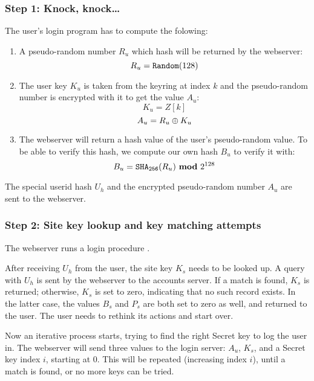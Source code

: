 \subsubsection{Step 1: Knock, knock\ldots}
\label{sec:login_step1}
The user's login program has to compute the folowing:
\begin{enumerate}
\item A pseudo-random number $R_u$ which hash will be returned by the webserver:
\[R_u=\texttt{Random}(128)\]
\item The user key $K_u$ is taken from the keyring at index $k$ and the pseudo-random number is encrypted with it to get the value $A_u$:
\[K_u=Z[k]\]
\[A_u=R_u\oplus K_u\]
\item The webserver will return a hash value of the user's pseudo-random value.
To be able to verify this hash,
we compute our own hash $B_u$ to verify it with:
\[B_u=\texttt{\ensuremath{\mathtt{SHA_{256}}}}(R_u)\ \textbf{mod}\ 2^{128}\]
\end{enumerate}
The special userid hash $U_h$ and the encrypted pseudo-random number $A_u$ are sent to the webserver.

\subsubsection{Step 2: Site key lookup and key matching attempts}
\label{sec:login_step2}
The webserver runs a login procedure%
.
\par
After receiving $U_h$ from the user, the site key $K_s$ needs to be looked up.
A query with $U_h$ is sent by the webserver to the accounts server.
If a match is found, $K_s$ is returned;
otherwise, $K_s$ is set to zero, indicating that no such record exists.
In the latter case, the values $B_s$ and $P_s$ are both set to zero as well, and returned to the user.
The user needs to rethink its actions and start over.
\par
Now an iterative process starts, trying to find the right Secret key to log the user in.
The webserver will send three values to the login server:
$A_u$,
$K_s$,
and a Secret key index $i$,
starting at 0.
This will be repeated
(increasing index $i$),
until a match is found,
or no more keys can be tried.

